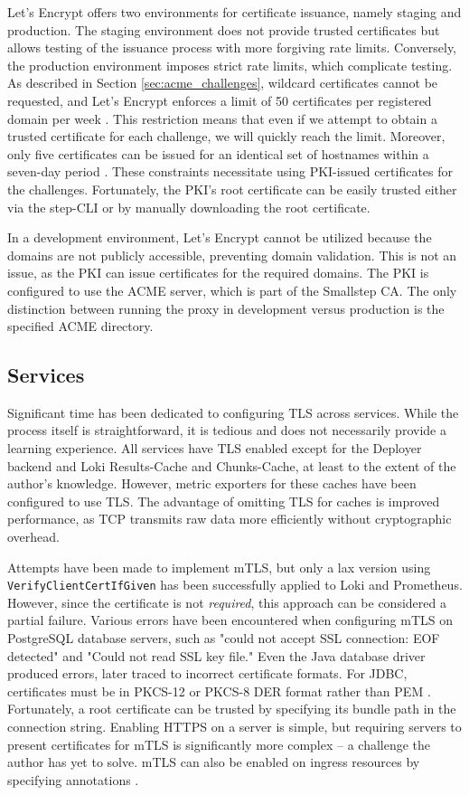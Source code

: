 Let's Encrypt offers two environments for certificate issuance, namely staging and production. The staging environment does not provide trusted certificates but allows testing of the issuance process with more forgiving rate limits. Conversely, the production environment imposes strict rate limits, which complicate testing. As described in Section \ref{sec:acme_challenges}, wildcard certificates cannot be requested, and Let's Encrypt enforces a limit of 50 certificates per registered domain per week \parencite{LetsEncryptRateLimits}. This restriction means that even if we attempt to obtain a trusted certificate for each challenge, we will quickly reach the limit. Moreover, only five certificates can be issued for an identical set of hostnames within a seven-day period \parencite{LetsEncryptRateLimits}. These constraints necessitate using PKI-issued certificates for the challenges. Fortunately, the PKI's root certificate can be easily trusted either via the step-CLI or by manually downloading the root certificate.

In a development environment, Let's Encrypt cannot be utilized because the domains are not publicly accessible, preventing domain validation. This is not an issue, as the PKI can issue certificates for the required domains. The PKI is configured to use the ACME server, which is part of the Smallstep CA. The only distinction between running the proxy in development versus production is the specified ACME directory.

\subsection{Services}
Significant time has been dedicated to configuring TLS across services. While the process itself is straightforward, it is tedious and does not necessarily provide a learning experience. All services have TLS enabled except for the Deployer backend and Loki Results-Cache and Chunks-Cache, at least to the extent of the author's knowledge. However, metric exporters for these caches have been configured to use TLS. The advantage of omitting TLS for caches is improved performance, as TCP transmits raw data more efficiently without cryptographic overhead.

Attempts have been made to implement mTLS, but only a lax version using \texttt{VerifyClientCertIfGiven} has been successfully applied to Loki and Prometheus. However, since the certificate is not \textit{required}, this approach can be considered a partial failure. Various errors have been encountered when configuring mTLS on PostgreSQL database servers, such as "could not accept SSL connection: EOF detected" and "Could not read SSL key file." Even the Java database driver produced errors, later traced to incorrect certificate formats. For JDBC, certificates must be in PKCS-12 or PKCS-8 DER format rather than PEM \parencite{PostgreSQLJDBC}. Fortunately, a root certificate can be trusted by specifying its bundle path in the connection string. Enabling HTTPS on a server is simple, but requiring servers to present certificates for mTLS is significantly more complex -- a challenge the author has yet to solve. mTLS can also be enabled on ingress resources by specifying annotations \parencite{KubernetesIngressNGINX}.

